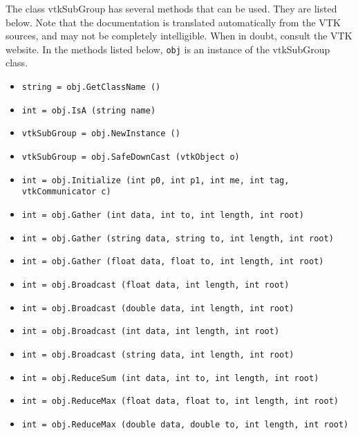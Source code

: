 The class vtkSubGroup has several methods that can be used.
  They are listed below.
Note that the documentation is translated automatically from the VTK sources,
and may not be completely intelligible.  When in doubt, consult the VTK website.
In the methods listed below, \verb|obj| is an instance of the vtkSubGroup class.
\begin{itemize}
\item  \verb|string = obj.GetClassName ()|

\item  \verb|int = obj.IsA (string name)|

\item  \verb|vtkSubGroup = obj.NewInstance ()|

\item  \verb|vtkSubGroup = obj.SafeDownCast (vtkObject o)|

\item  \verb|int = obj.Initialize (int p0, int p1, int me, int tag, vtkCommunicator c)|

\item  \verb|int = obj.Gather (int data, int to, int length, int root)|

\item  \verb|int = obj.Gather (string data, string to, int length, int root)|

\item  \verb|int = obj.Gather (float data, float to, int length, int root)|

\item  \verb|int = obj.Broadcast (float data, int length, int root)|

\item  \verb|int = obj.Broadcast (double data, int length, int root)|

\item  \verb|int = obj.Broadcast (int data, int length, int root)|

\item  \verb|int = obj.Broadcast (string data, int length, int root)|

\item  \verb|int = obj.ReduceSum (int data, int to, int length, int root)|

\item  \verb|int = obj.ReduceMax (float data, float to, int length, int root)|

\item  \verb|int = obj.ReduceMax (double data, double to, int length, int root)|


\end{itemize}
